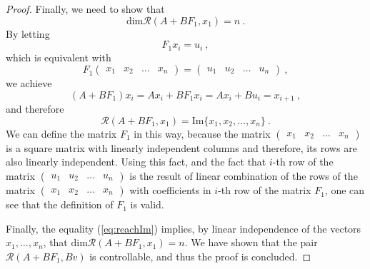 \begin{proof}
    Finally, we need to show that
    $$\text{dim}\mathcal{R}(A+BF_1,x_1)=n\ .$$
    By letting 
    $$F_1x_i=u_i\ ,$$
    which is equivalent with 
    \begin{equation}
        F_1
        \begin{pmatrix}
            x_1 & x_2 & \ldots & x_n
        \end{pmatrix}
        =
        \begin{pmatrix}
            u_1 & u_2 & \ldots & u_n
        \end{pmatrix}\ ,
    \end{equation}
    we achieve
    $$(A+BF_1)x_i=Ax_i+BF_1x_i=Ax_i+Bu_i=x_{i+1}\ ,$$
    and therefore 
    \begin{equation}
    \label{eq:reachIm}
        \mathcal{R}(A+BF_1,x_1)=\text{Im}\{x_1,x_2,\ldots,x_n\}\ .
    \end{equation}
    We can define the matrix $F_1$ in this way, because the matrix $\begin{pmatrix} x_1 & x_2 & \ldots & x_n \end{pmatrix}$ is a square matrix with linearly independent columns and therefore, its rows are also linearly independent. Using this fact, and the fact that $i$-th row of the matrix $\begin{pmatrix} u_1 & u_2 & \ldots & u_n \end{pmatrix}$ is the result of linear combination of the rows of the matrix $\begin{pmatrix} x_1 & x_2 & \ldots & x_n \end{pmatrix}$ with coefficients in $i$-th row of the matrix $F_1$, one can see that the definition of $F_1$ is valid.

    Finally, the equality (\ref{eq:reachIm}) implies, by linear independence of the vectors $x_1,\ldots,x_n$, that $\text{dim}\mathcal{R}(A+BF_1,x_1)=n$. We have shown that the pair $\mathcal{R}(A+BF_1,Bv)$ is controllable, and thus the proof is concluded.
\end{proof}